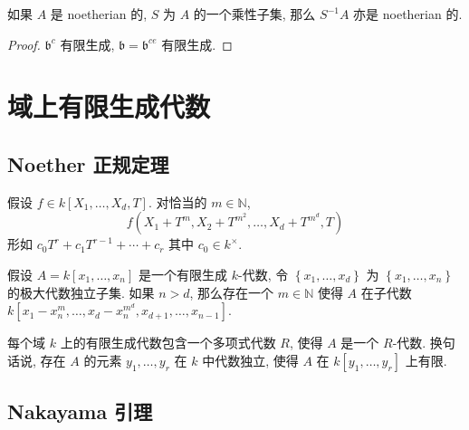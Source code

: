 \begin{proposition}
  如果 \( A \) 是 noetherian 的, \( S \) 为 \( A \) 的一个乘性子集, 那么 \(
  S^{-1} A \) 亦是 noetherian 的.
\end{proposition}
\begin{proof}
  \( \mathfrak{b}^c \) 有限生成, \( \mathfrak{b} = \mathfrak{b}^{ce} \)
  有限生成.
\end{proof}

\section{域上有限生成代数}

\subsection{Noether 正规定理}

\begin{lemma}
  假设 \( f \in k[X_1, \ldots, X_d, T] \). 对恰当的 \( m \in \mathbb{N} \),
  \[
    f\left(X_1 + T^m, X_2 + T^{m^2}, \ldots, X_d + T^{m^d}, T\right)
  \]
  形如 \( c_0 T^r + c_1 T^{r - 1} + \cdots + c_r \) 其中 \( c_0 \in k^{\times}
  \).
\end{lemma}

\begin{lemma}
  假设 \( A = k[x_1, \ldots, x_n] \) 是一个有限生成 \( k \)-代数, 令 \(
  \left\lbrace x_1, \ldots, x_d \right\rbrace \) 为 \( \left\lbrace x_1, \ldots,
  x_n \right\rbrace \) 的极大代数独立子集. 如果 \( n > d \), 那么存在一个 \( m
  \in \mathbb{N} \) 使得 \( A \) 在子代数 \( k\left[x_1 - x_n^m,\ldots, x_d -
  x_n^{m^d}, x_{d + 1}, \ldots, x_{n - 1}\right] \).
\end{lemma}

\begin{theorem}[Noether正规定理]
  每个域 \( k \) 上的有限生成代数包含一个多项式代数 \( R \), 使得 \( A \) 是一个
  \( R \)-代数. 换句话说, 存在 \( A \) 的元素 \( y_1, \ldots, y_r \) 在 \( k \)
  中代数独立, 使得 \( A \) 在 \( k[y_1, \ldots, y_r] \) 上有限.
\end{theorem}

\subsection{Nakayama 引理}

